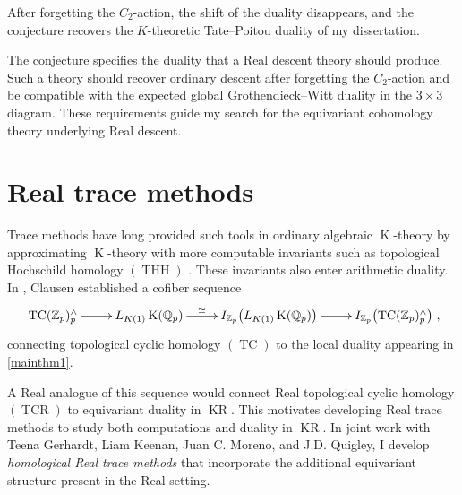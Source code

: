 \documentclass[11pt]{article}
\newcommand{\KR}{\operatorname{KR}}
\newcommand{\K}{\operatorname{K}}
\newcommand{\THH}{\operatorname{THH}}
\begin{document}
After forgetting the \(C_2\)-action, the shift of the duality disappears, and the conjecture recovers the \(K\)-theoretic Tate--Poitou duality of my dissertation.

The conjecture specifies the duality that a Real descent theory should produce. Such a theory should recover ordinary descent after forgetting the \(C_2\)-action and be compatible with the expected global Grothendieck–Witt duality in the \(3\times3\) diagram. These requirements guide my search for the equivariant cohomology theory underlying Real descent.

\section{Real trace methods}
Trace methods have long provided such tools in ordinary algebraic $\K$-theory by approximating $\K$-theory with more computable invariants such as topological Hochschild homology $(\THH)$ \cite{MR3013261}.
These invariants also enter arithmetic duality.
In \cite{Clausen17}, Clausen established a cofiber sequence
\[\xymatrix{\operatorname{TC}(\mathbb Z_p)^\wedge_p \ar[r]& L_{K(1)}\K(\mathbb Q_p) \ar[r]^-\simeq &   I_{\mathbb Z_p}\bigl( L_{K(1)}\K(\mathbb Q_p) \bigr)  \ar[r] & I_{\mathbb Z_p}\bigl(\operatorname{TC}(\mathbb Z_p)^\wedge_p\bigr)},
\]
connecting topological cyclic homology $(\operatorname{TC})$ to the local duality appearing in \autoref{mainthm1}.

A Real analogue of this sequence would connect Real topological cyclic homology $(\operatorname{TCR})$ to equivariant duality in $\KR$.
This motivates developing Real trace methods to study both computations and duality in $\KR$.
In joint work with Teena Gerhardt, Liam Keenan, Juan C. Moreno, and J.D. Quigley, I develop \emph{homological Real trace methods} that incorporate the additional equivariant structure present in the Real setting.
\end{document}
